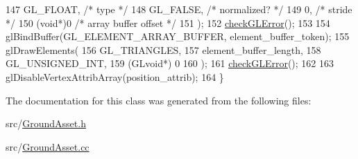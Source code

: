 \begin{DoxyCode}
147     GL\_FLOAT,   \textcolor{comment}{/* type */}
148     GL\_FALSE,   \textcolor{comment}{/* normalized? */}
149     0,        \textcolor{comment}{/* stride */}
150     (\textcolor{keywordtype}{void}*)0    \textcolor{comment}{/* array buffer offset */}
151   );
152   \hyperlink{GroundAsset_8cc_a75f201b0e53e68726854997957322b8d}{checkGLError}();
153 
154   glBindBuffer(GL\_ELEMENT\_ARRAY\_BUFFER, element\_buffer\_token);
155   glDrawElements(
156     GL\_TRIANGLES,
157     element\_buffer\_length,
158     GL\_UNSIGNED\_INT,
159     (GLvoid*) 0
160   );
161   \hyperlink{GroundAsset_8cc_a75f201b0e53e68726854997957322b8d}{checkGLError}();
162 
163   glDisableVertexAttribArray(position\_attrib);
164 \}
\end{DoxyCode}


The documentation for this class was generated from the following files\+:\begin{DoxyCompactItemize}
\item 
src/\hyperlink{GroundAsset_8h}{Ground\+Asset.\+h}\item 
src/\hyperlink{GroundAsset_8cc}{Ground\+Asset.\+cc}\end{DoxyCompactItemize}
